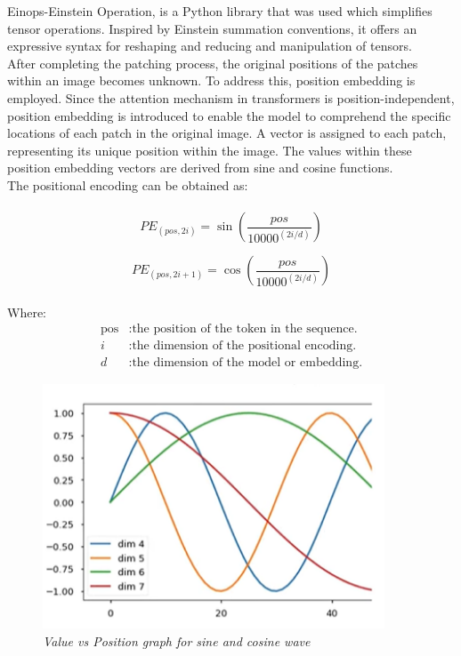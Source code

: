 Einops-Einstein Operation, is a Python library that was used which simplifies tensor operations. Inspired by Einstein summation conventions, it offers an expressive syntax for reshaping and reducing and manipulation of tensors. \\

After completing the patching process, the original positions of the patches within an image becomes unknown. To address this, position embedding is employed. Since the attention mechanism in transformers is position-independent, position embedding is introduced to enable the model to comprehend the specific locations of each patch in the original image. A vector is assigned to each patch, representing its unique position within the image. The values within these position embedding vectors are derived from sine and cosine functions.\\

The positional encoding can be obtained as:\\
\\
\[
PE_{(pos, 2i)} = \sin\left(\frac{pos}{{10000}^{(2i/d)}}\right)
\]

\[
PE_{(pos, 2i+1)} = \cos\left(\frac{pos}{{10000}^{(2i/d)}}\right)
\]
\\
Where:
\begin{align*}
    \text{pos} & : \text{the position of the token in the sequence.} \\
    i & : \text{the dimension of the positional encoding.} \\
    d & : \text{the dimension of the model or embedding.}
\end{align*}

\begin{figure}[htbp]
    \centering
    \includegraphics[width=4in]{img/plot for sine and cosine wave.png}
    \caption{\textit{Value vs Position graph for sine and cosine wave}}
\end{figure}

